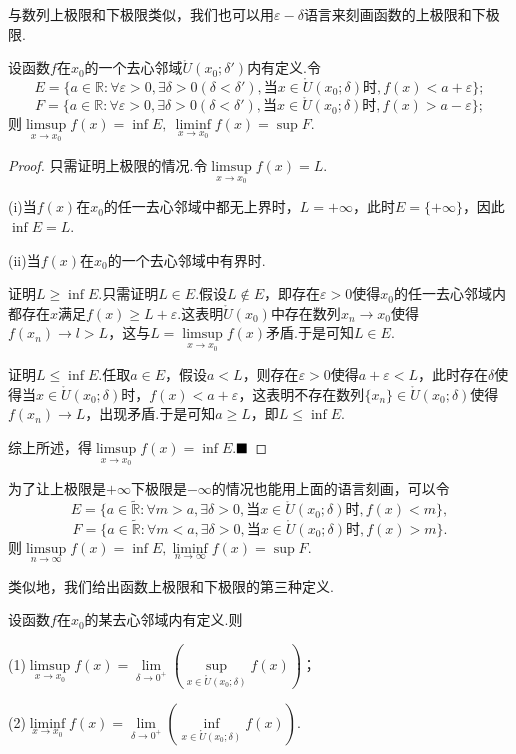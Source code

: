 与数列上极限和下极限类似，我们也可以用$\varepsilon-\delta$语言来刻画函数的上极限和下极限.
\begin{theorem}
	设函数$f$在$x_0$的一个去心邻域$\mathring{U}(x_0;\delta')$内有定义.令
	$$E=\{a\in\mathbb{R}:\forall\varepsilon>0,\exists \delta>0(\delta<\delta'),\text{当}x\in\mathring{U}(x_0;\delta)\text{时},f(x)<a+\varepsilon\};$$
	$$F=\{a\in\mathbb{R}:\forall\varepsilon>0,\exists \delta>0(\delta<\delta'),\text{当}x\in\mathring{U}(x_0;\delta)\text{时},f(x)>a-\varepsilon\};$$
	则$\limsup\limits_{x\to x_0}f(x)=\inf E,\ \liminf\limits_{x\to x_0}f(x)=\sup F$.
\end{theorem}
\begin{proof}
	只需证明上极限的情况.令$\limsup\limits_{x\to x_0}f(x)=L$.
	
	(i)当$f(x)$在$x_0$的任一去心邻域中都无上界时，$L=+\infty$，此时$E=\{+\infty\}$，因此$\inf E=L$.
	
	(ii)当$f(x)$在$x_0$的一个去心邻域中有界时.
	
	证明$L\geqslant \inf E$.只需证明$L\in E$.假设$L\notin E$，即存在$\varepsilon>0$使得$x_0$的任一去心邻域内都存在$x$满足$f(x)\geqslant L+\varepsilon$.这表明$\mathring{U}(x_0)$中存在数列$x_n\to x_0$使得$f(x_n)\to l>L$，这与$L=\limsup\limits_{x\to x_0}f(x)$矛盾.于是可知$L\in E$.
	
	证明$L\leqslant\inf E$.任取$a\in E$，假设$a<L$，则存在$\varepsilon>0$使得$a+\varepsilon<L$，此时存在$\delta$使得当$x\in \mathring{U}(x_0;\delta)$时，$f(x)<a+\varepsilon$，这表明不存在数列$\{x_n\}\in\mathring{U}(x_0;\delta)$使得$f(x_n)\to L$，出现矛盾.于是可知$a\geqslant L$，即$L\leqslant\inf E$.
	
	综上所述，得$\limsup\limits_{x\to x_0}f(x)=\inf E$.$\hfill\blacksquare$
\end{proof}
\begin{remark}
	为了让上极限是$+\infty$下极限是$-\infty$的情况也能用上面的语言刻画，可以令
	$$E=\{a\in\widetilde{\mathbb{R}}:\forall m>a,\exists \delta>0,\text{当}x\in\mathring{U}(x_0;\delta)\text{时},f(x)<m\},$$
	$$F=\{a\in\widetilde{\mathbb{R}}:\forall m<a,\exists \delta>0,\text{当}x\in\mathring{U}(x_0;\delta)\text{时},f(x)>m\}.$$
	则$\limsup\limits_{n\to\infty}f(x)=\inf E,\liminf\limits_{n\to\infty}f(x)=\sup F.$
\end{remark}
类似地，我们给出函数上极限和下极限的第三种定义.
\begin{theorem}
	设函数$f$在$x_0$的某去心邻域内有定义.则
	
	(1)$\limsup\limits_{x\to x_0}f(x)=\lim\limits_{\delta\to 0^+}\left(\sup\limits_{x\in \mathring{U}(x_0;\delta)}f(x)\right)$；
	
	(2)$\liminf\limits_{x\to x_0}f(x)=\lim\limits_{\delta\to 0^+}\left(\inf\limits_{x\in \mathring{U}(x_0;\delta)}f(x)\right)$.
\end{theorem}
